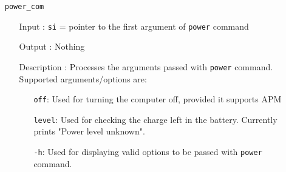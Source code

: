 \begin{enumerate}
  \item[] \texttt{power\_com}
  		\begin{enumerate}[align=parleft, labelsep=2cm, leftmargin=1.06in]
  		  \item[Input]: \texttt{si} = pointer to the first argument of \texttt{power} command
  		  \item[Output]: Nothing
  		  \item[Description]: Processes the arguments passed with \texttt{power} command. Supported arguments/options are:
  		  \begin{enumerate}
  		  \item[]\texttt{off}: Used for turning the computer off, provided it supports APM
  		  \item[]\texttt{level}: Used for checking the charge left in the battery. Currently prints "Power level unknown".
  		  \item[]\texttt{-h}: Used for displaying valid options to be passed with \texttt{power} command.
		\end{enumerate}
  		\end{enumerate}
\end{enumerate}

